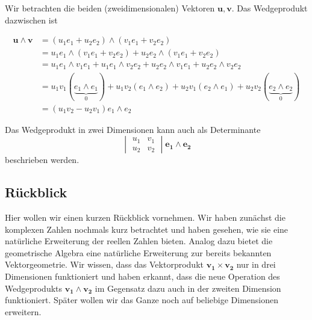 \begin{definition}
  Wir betrachten die beiden (zweidimensionalen) Vektoren $\mathbf{u},
  \mathbf{v}$.
  Das Wedgeprodukt dazwischen ist

  \begin{equation}
    \begin{aligned}
    \mathbf{u} \wedge \mathbf{v} &= (u_1 e_1 + u_2 e_2) \wedge
    (v_1 e_1 + v_2 e_2) \\
    &= u_1 e_1 \wedge (v_1 e_1 + v_2 e_2) + u_2 e_2 \wedge (v_1 e_1 + v_2 e_2) \\
    &= u_1 e_1 \wedge v_1 e_1 + u_1 e_1 \wedge v_2 e_2 + u_2 e_2 \wedge v_1 e_1 + u_2 e_2 \wedge v_2 e_2 \\
    &= u_1 v_1 (\underbrace{e_1 \wedge e_1}_{0}) + u_1 v_2 (e_1 \wedge e_2) + u_2 v_1 (e_2 \wedge e_1) + u_2 v_2 (\underbrace{e_2 \wedge e_2}_{0}) \\
    &= (u_1 v_2 - u_2 v_1) e_1 \wedge e_2
    \end{aligned}
  \end{equation}
\end{definition}

Das Wedgeprodukt in zwei Dimensionen kann auch als Determinante
\begin{equation}
  \begin{vmatrix}
    u_1 & v_1 \\
    u_2 & v_2
  \end{vmatrix}
  \mathbf{e_1} \wedge \mathbf{e_2}
\end{equation}
beschrieben werden.

\subsection{Rückblick}
Hier wollen wir einen kurzen Rückblick vornehmen. Wir haben zunächst
die komplexen Zahlen nochmals kurz betrachtet und haben gesehen,
wie sie eine natürliche Erweiterung der reellen Zahlen bieten.
Analog dazu bietet die geometrische Algebra eine natürliche
Erweiterung zur bereits bekannten Vektorgeometrie. Wir wissen,
dass das Vektorprodukt $\mathbf{v_1} \times \mathbf{v_2}$ nur
in drei Dimensionen funktioniert und haben erkannt, dass
die neue Operation des Wedgeprodukts $\mathbf{v_1} \wedge \mathbf{v_2}$
im Gegensatz dazu auch in der zweiten Dimension funktioniert.
Später wollen wir das Ganze noch auf beliebige Dimensionen erweitern.
